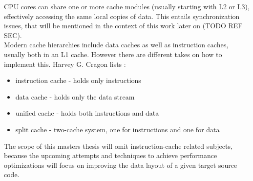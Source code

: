 CPU cores can share one or more cache modules (usually starting with L2 or L3), effectively accessing the same local copies of data. This entails synchronization issues, that will be mentioned in the context of this work later on (TODO REF SEC).\\
Modern cache hierarchies include data caches as well as instruction caches, usually both in an L1 cache. However there are different takes on how to implement this. Harvey G. Cragon lists :
\begin{itemize}
	\item instruction cache - holds only instructions
	\item data cache - holds only the data stream
	\item unified cache - holds both instructions and data
	\item split cache - two-cache system, one for instructions and one for data
\end{itemize}
The scope of this masters thesis will omit instruction-cache related subjects, because the upcoming attempts and techniques to achieve performance optimizations will focus on improving the data layout of a given target source code.

